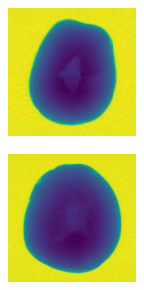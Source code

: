 \documentclass[11pt]{article}
\begin{document}
\begin{figure}[!h]
\begin{subfigure}[b]{0.22\textwidth}
         \caption{}
         \label{fig:hollow_31}
     \end{subfigure}
          \\
    \begin{subfigure}[b]{0.22\textwidth}
         \centering
         \includegraphics[width=\textwidth]{figurer/potato_dataset/hollow/hollow_32.jpg}
         \caption{}
         \label{fig:hollow_32}
     \end{subfigure}
     \hfill
     \begin{subfigure}[b]{0.22\textwidth}
         \centering
         \includegraphics[width=\textwidth]{figurer/potato_dataset/hollow/hollow_33.jpg}

\end{subfigure}
\end{figure}
\end{document}
